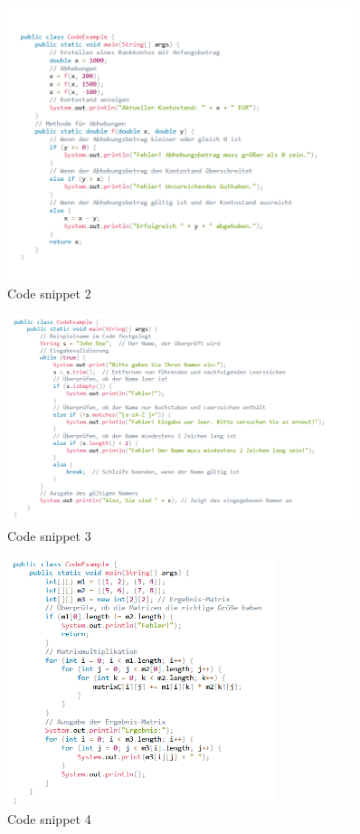 \begin{figure}[H]
    \centering
    \includegraphics[width=0.9\textwidth]{figures/konto.png}
    \caption{Code snippet 2}
    \label{fig:appendix-example2}
\end{figure}

\begin{figure}[H]
    \centering
    \includegraphics[width=0.9\textwidth]{figures/name.png}
    \caption{Code snippet 3}
    \label{fig:appendix-example3}
\end{figure}


\begin{figure}[H]
    \centering
    \includegraphics[width=0.7\textwidth]{figures/m.png}
    \caption{Code snippet 4}
    \label{fig:appendix-example4}
\end{figure}


